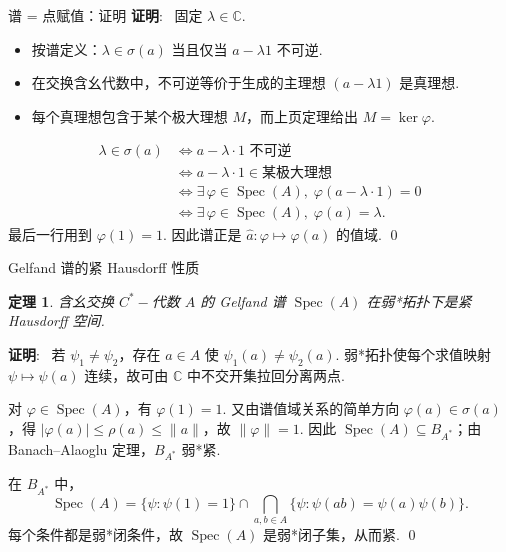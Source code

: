 \documentclass[notheorems,11pt]{beamer}
\theoremstyle{plain}
\newtheorem{theorem}{定理}
\numberwithin{theorem}{section}
\numberwithin{lemma}{section}
\numberwithin{corollary}{section}
\theoremstyle{example}
\renewenvironment{proof}[1][证明]{\textbf{#1}:~}{\qed\par}
\DeclareMathOperator{\Spec}{Spec}
\begin{document}
\begin{frame}{谱 = 点赋值：证明}
  \begin{proof}\small
    固定 $\lambda \in \mathbb{C}$.
    \begin{itemize}
      \item 按谱定义：$\lambda\in\sigma(a)$ 当且仅当 $a-\lambda1$ 不可逆.
      \item 在交换含幺代数中，不可逆等价于生成的主理想 $(a-\lambda1)$ 是真理想.
      \item 每个真理想包含于某个极大理想 $M$，而上页定理给出 $M=\ker\varphi$.
    \end{itemize}
    \begin{align*}
      \lambda \in \sigma(a) &\iff a-\lambda\cdot 1 \text{ 不可逆} \\
      &\iff a-\lambda\cdot 1 \in \text{某极大理想} \\
      &\iff \exists\,\varphi \in \Spec(A),\; \varphi(a-\lambda\cdot 1) = 0 \\
      &\iff \exists\,\varphi \in \Spec(A),\; \varphi(a) = \lambda.
    \end{align*}
    最后一行用到 $\varphi(1)=1$.
    因此谱正是 $\widehat a:\varphi\mapsto\varphi(a)$ 的值域.
  \end{proof}
\end{frame}

\begin{frame}{Gelfand 谱的紧 Hausdorff 性质}
  \begin{theorem}
    含幺交换 $C^*-\!$代数 $A$ 的 Gelfand 谱 $\Spec(A)$ 在弱*拓扑下是紧 Hausdorff 空间.
  \end{theorem}
  \pause
  \begin{proof}\small
     若 $\psi_1\neq\psi_2$，存在 $a\in A$ 使 $\psi_1(a)\neq\psi_2(a)$.
    弱*拓扑使每个求值映射 $\psi\mapsto\psi(a)$ 连续，故可由 $\mathbb C$ 中不交开集拉回分离两点.\par
     对 $\varphi\in\Spec(A)$，有 $\varphi(1)=1$.
    又由谱值域关系的简单方向 $\varphi(a)\in\sigma(a)$，得
    $|\varphi(a)|\le\rho(a)\le\|a\|$，故 $\|\varphi\|=1$.
    因此 $\Spec(A)\subseteq B_{A^*}$；由 Banach--Alaoglu 定理，$B_{A^*}$ 弱*紧.\par
     在 $B_{A^*}$ 中，
    \begin{equation*}
      \Spec(A)=
      \{\psi:\psi(1)=1\}
      \cap\bigcap_{a,b\in A}\{\psi:\psi(ab)=\psi(a)\psi(b)\}.
    \end{equation*}
    每个条件都是弱*闭条件，故 $\Spec(A)$ 是弱*闭子集，从而紧.
  \end{proof}
\end{frame}
\end{document}
